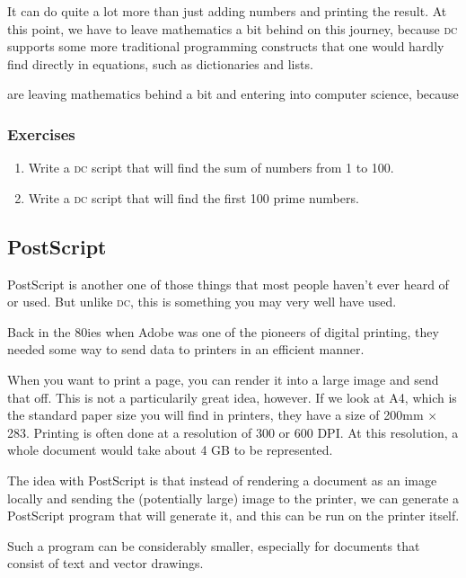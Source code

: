\documentclass[a4paper,twocolumn]{article}
\begin{document}
It can do quite a lot more than just adding numbers and printing the result. At this point, we have to leave mathematics a bit behind on this journey, because \textsc{dc} supports some more traditional programming constructs that one would hardly find directly in equations, such as dictionaries and lists.



are leaving mathematics behind a bit and entering into computer science, because 

\subsubsection*{Exercises}

\begin{enumerate}
  \item Write a \textsc{dc} script that will find the sum of numbers from 1 to 100.
  \item Write a \textsc{dc} script that will find the first 100 prime numbers.
\end{enumerate}

\subsection{PostScript}

PostScript is another one of those things that most people haven't ever heard of or used. But unlike \textsc{dc}, this is something you may very well have used.

Back in the 80ies when Adobe was one of the pioneers of digital printing, they needed some way to send data to printers in an efficient manner.

When you want to print a page, you can render it into a large image and send that off. This is not a particularily great idea, however. If we look at A4, which is the standard paper size you will find in printers, they have a size of 200mm $\times$ 283. Printing is often done at a resolution of 300 or 600 DPI. At this resolution, a whole document would take about 4 GB to be represented.

The idea with PostScript is that instead of rendering a document as an image locally and sending the (potentially large) image to the printer, we can generate a PostScript program that will generate it, and this can be run on the printer itself.

Such a program can be considerably smaller, especially for documents that consist of text and vector drawings.
\end{document}
